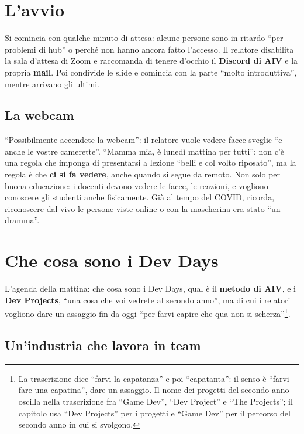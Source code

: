 \section{L'avvio}
\label{p1:sec:avvio}

Si comincia con qualche minuto di attesa: alcune persone sono in ritardo
``per problemi di hub'' o perché non hanno ancora fatto l'accesso. Il
relatore disabilita la sala d'attesa di Zoom e raccomanda di tenere
d'occhio il \textbf{Discord di AIV} e la propria \textbf{mail}. Poi
condivide le slide e comincia con la parte ``molto introduttiva'', mentre
arrivano gli ultimi.

\subsection{La webcam}

``Possibilmente accendete la webcam'': il relatore vuole vedere facce sveglie
``e anche le vostre camerette''. ``Mamma mia, è lunedì mattina per tutti'':
non c'è una regola che imponga di presentarsi a lezione ``belli e col volto
riposato'', ma la regola è che \textbf{ci si fa vedere}, anche quando si
segue da remoto. Non solo per buona educazione: i docenti devono vedere le
facce, le reazioni, e vogliono conoscere gli studenti anche fisicamente. Già
al tempo del COVID, ricorda, riconoscere dal vivo le persone viste online o
con la mascherina era stato ``un dramma''.

\section{Che cosa sono i Dev Days}
\label{p1:sec:devdays}

L'agenda della mattina: che cosa sono i Dev Days, qual è il \textbf{metodo di
AIV}, e i \textbf{Dev Projects}, ``una cosa che voi vedrete al secondo
anno'', ma di cui i relatori vogliono dare un assaggio fin da oggi ``per
farvi capire che qua non si scherza''\footnote{La trascrizione dice
``farvi la capatanza'' e poi ``capatanta'': il senso è ``farvi fare una
capatina'', dare un assaggio. Il nome dei progetti del secondo anno
oscilla nella trascrizione fra ``Game Dev'', ``Dev Project'' e ``The
Projects''; il capitolo usa ``Dev Projects'' per i progetti e ``Game Dev''
per il percorso del secondo anno in cui si svolgono.}.

\subsection{Un'industria che lavora in team}

